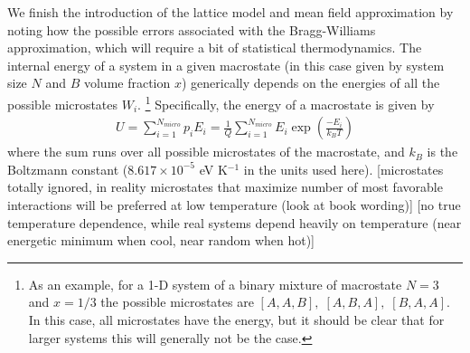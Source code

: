 \documentclass[10pt]{article}
\begin{document}
We finish the introduction of the lattice model and mean field approximation by noting how the possible errors associated with the Bragg-Williams approximation, which will require a bit of statistical thermodynamics.
The internal energy of a system in a given macrostate (in this case given by system size $N$ and $B$ volume fraction $x$) generically depends on the energies of all the possible microstates $W_i$. \footnote{As an example, for a 1-D system of a binary mixture of macrostate $N=3$ and $x=1/3$ the possible microstates are $[A,A,B],\; [A,B,A],\; [B,A,A]$. In this case, all microstates have the energy, but it should be clear that for larger systems this will generally not be the case.}
Specifically, the energy of a macrostate is given by
\begin{align}
    U = \sum_{i=1}^{N_{micro}} p_i E_i
    = \frac{1}{Q} \sum_{i=1}^{N_{micro}} E_i \exp\left(\frac{-E_i}{k_B T}\right)
\end{align}
where the sum runs over all possible microstates of the macrostate, and $k_B$ is the Boltzmann constant ($8.617 \times 10^{-5}$ eV K$^{-1}$ in the units used here).
[microstates totally ignored, in reality microstates that maximize number of most favorable interactions will be preferred at low temperature (look at book wording)]
[no true temperature dependence, while real systems depend heavily on temperature (near energetic minimum when cool, near random when hot)]


%
\end{document}
